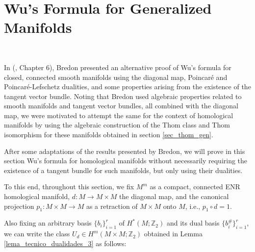 \documentclass[12pt,oneside]{book}
\newcommand{\Z}{\mathbb{Z}}
\begin{document}
    \section{Wu's Formula for Generalized Manifolds}\label{sec_form_wu_gen}

    \

    In (\cite{bredon}, Chapter 6), Bredon presented an alternative proof of Wu's formula for closed, connected smooth 
    manifolds using the diagonal map, Poincaré and 
    Poincaré-Lefschetz dualities, and some properties arising from the existence of the tangent vector 
    bundle. Noting that Bredon used algebraic properties related to smooth manifolds and tangent vector bundles, 
    all combined with the diagonal map, we were motivated to attempt the same for the context of homological manifolds by 
    using the algebraic construction of the Thom class and Thom isomorphism for these manifolds 
    obtained in section \ref{sec_thom_gen}.

    After some adaptations of the results presented by Bredon, we will prove in this section Wu's formula for homological 
    manifolds without necessarily requiring the existence of a tangent bundle for such manifolds, but only using 
    their dualities.

    To this end, throughout this section, we fix $M^{m}$ as a compact, connected ENR homological 
    manifold, $d:M \to M \times M$ the diagonal map, and the canonical projection 
    $p_{1}: M \times M \to M$ as a retraction of $M \times M$ onto $M$, i.e., $p_{1} \circ d = 1$.

    Also fixing an arbitrary basis $\{b_{i}\}_{i=1}^{r}$ of $H^{*}(M; \Z_{2})$ and its dual basis 
    $\{b^{\#}_{i}\}_{i=1}^{r}$, we can write the class $U_{d} \in H^{m}(M \times M; \Z_{2})$ obtained in Lemma \ref{lema_tecnico_dualidades_3} 
    as follows:
\end{document}
